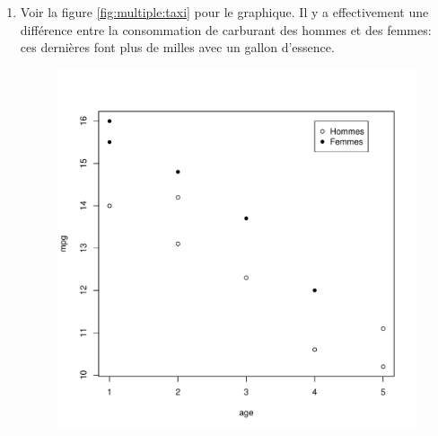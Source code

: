\begin{solution}{3.18}
    \begin{enumerate}
    \item Voir la figure \ref{fig:multiple:taxi} pour le graphique. Il
      y a effectivement une différence entre la consommation de
      carburant des hommes et des femmes: ces dernières font plus de
      milles avec un gallon d'essence.
      \begin{figure}
        \centering
\begin{knitrout}
\color{fgcolor}\begin{kframe}
\begin{alltt}
 \hlkwb{<-}  \hlopt{==} \hlstd{)}
 \hlkwb{<-}  \hlopt{==} \hlstd{)}
 \hlopt{~}   
      \hlstd{=} \hlopt{$}  \hlstd{=} \hlopt{$}
 \hlopt{~}     \hlstd{=} \hlstd{)}
\hlstd{(}\hlstd{,} \hlstd{,}  \hlstd{=} \hlstd{(}\hlstd{,} \hlstd{),}  \hlstd{=} \hlstd{(}\hlstd{,} \hlstd{))}
\end{alltt}
\end{kframe}
\includegraphics[width=\maxwidth]{figure/unnamed-chunk-62-1}


\end{knitrout}
\end{figure}
\end{enumerate}
\end{solution}
